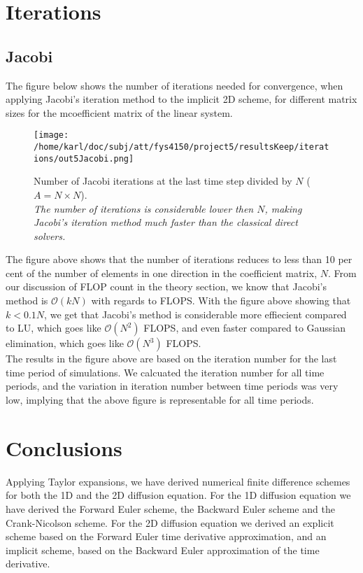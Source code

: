 \documentclass{article}
\begin{document}
\section{Iterations}

\subsection{Jacobi}
The figure below shows the number of iterations needed for convergence, when applying Jacobi's iteration method to the implicit 2D scheme, for different matrix sizes for the mcoefficient matrix of the linear system.

\begin{figure}[H]
	\centering
	\texttt{[image: /home/karl/doc/subj/att/fys4150/project5/resultsKeep/iterations/out5Jacobi.png]}
	\caption{Number of Jacobi iterations at the last time step divided by $N$ ($A = N \times N$).\\ \textit{The number of iterations is considerable lower then $N$, making Jacobi's iteration method much faster than the classical direct solvers.}}
	\label{1}
\end{figure}

The figure above shows that the number of iterations reduces to less than 10 per cent of the number of elements in one direction in the coefficient matrix, $N$. From our discussion of FLOP count in the theory section, we know that Jacobi's method is $\mathcal{O}(kN)$ with regards to FLOPS. With the figure above showing that $k < 0.1N$, we get that Jacobi's method is considerable more effiecient compared to LU, which goes like $\mathcal{O}(N^2)$ FLOPS, and even faster compared to Gaussian elimination, which goes like $\mathcal{O}(N^3)$ FLOPS.\\

The results in the figure above are based on the iteration number for the last time period of simulations. We calcuated the iteration number for all time periods, and the variation in iteration number between time periods was very low, implying that the above figure is representable for all time periods.

\section{Conclusions}
Applying Taylor expansions, we have derived numerical finite difference schemes for both the 1D and the 2D diffusion equation. For the 1D diffusion equation we have derived the Forward Euler scheme, the Backward Euler scheme and the Crank-Nicolson scheme. For the 2D diffusion equation we derived an explicit scheme based on the Forward Euler time derivative approximation, and an implicit scheme, based on the Backward Euler approximation of the time derivative.\\
\end{document}

